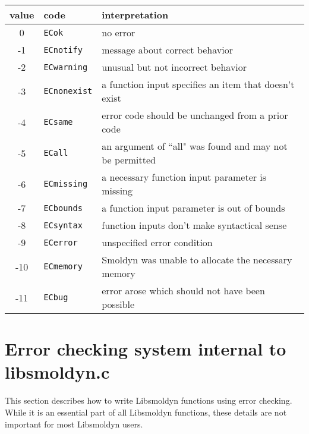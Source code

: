 \documentclass {book}
\newcommand {\ttt} {\texttt}
\begin{document}
\begin{longtable}[c]{cll}
value & code & interpretation\\
\hline
0 & \ttt{ECok} & no error\\
-1 & \ttt{ECnotify} & message about correct behavior\\
-2 & \ttt{ECwarning} & unusual but not incorrect behavior\\
-3 & \ttt{ECnonexist} & a function input specifies an item that doesn't exist\\
-4 & \ttt{ECsame} & error code should be unchanged from a prior code\\
-5 & \ttt{ECall} & an argument of ``all" was found and may not be permitted\\
-6 & \ttt{ECmissing} & a necessary function input parameter is missing\\
-7 & \ttt{ECbounds} & a function input parameter is out of bounds\\
-8 & \ttt{ECsyntax} & function inputs don't make syntactical sense\\
-9 & \ttt{ECerror} & unspecified error condition\\
-10 & \ttt{ECmemory} & Smoldyn was unable to allocate the necessary memory\\
-11 & \ttt{ECbug} & error arose which should not have been possible\\

\end{longtable}

\section{Error checking system internal to libsmoldyn.c}

This section describes how to write Libsmoldyn functions using error checking. While it is an essential part of all Libsmoldyn functions, these details are not important for most Libsmoldyn users.
\end{document}
